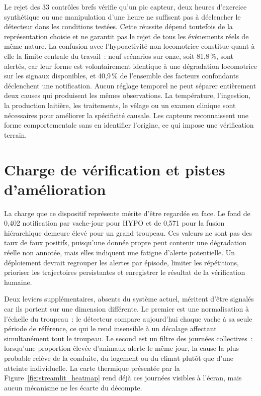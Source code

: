 Le rejet des 33 contrôles brefs vérifie qu'un pic capteur, deux heures d'exercice synthétique
ou une manipulation d'une heure ne suffisent pas à déclencher le détecteur dans les conditions
testées. Cette réussite dépend toutefois de la représentation choisie et ne garantit pas le
rejet de tous les événements réels de même nature. La confusion avec l'hypoactivité non
locomotrice constitue quant à elle la limite centrale du travail~: neuf scénarios sur onze,
soit 81,8\,\%, sont alertés, car leur forme est volontairement identique à une dégradation
locomotrice sur les signaux disponibles, et 40,9\,\% de l'ensemble des facteurs confondants
déclenchent une notification. Aucun réglage temporel ne peut séparer entièrement deux causes
qui produisent les mêmes observations. La température, l'ingestion, la production laitière,
les traitements, le vêlage ou un examen clinique sont nécessaires pour améliorer la
spécificité causale. Les capteurs reconnaissent une forme comportementale sans en identifier
l'origine, ce qui impose une vérification terrain.

\section{Charge de vérification et pistes d'amélioration}
La charge que ce dispositif représente mérite d'être regardée en face. Le fond de 0,402
notification par vache-jour pour HYPO et de 0,571 pour la fusion hiérarchique demeure élevé
pour un grand troupeau. Ces valeurs ne sont pas des taux de faux positifs, puisqu'une donnée
propre peut contenir une dégradation réelle non annotée, mais elles indiquent une fatigue
d'alerte potentielle. Un déploiement devrait regrouper les alertes par épisode, limiter les
répétitions, prioriser les trajectoires persistantes et enregistrer le résultat de la
vérification humaine.

Deux leviers supplémentaires, absents du système actuel, méritent d'être signalés car ils
portent sur une dimension différente. Le premier est une normalisation à l'échelle du
troupeau~: le détecteur compare aujourd'hui chaque vache à sa seule période de référence, ce
qui le rend insensible à un décalage affectant simultanément tout le troupeau. Le second est
un filtre des journées collectives~: lorsqu'une proportion élevée d'animaux alerte le même
jour, la cause la plus probable relève de la conduite, du logement ou du climat plutôt que
d'une atteinte individuelle. La carte thermique présentée par la Figure~\ref{fig:streamlit_heatmap} rend
déjà ces journées visibles à l'écran, mais aucun mécanisme ne les écarte du décompte.

